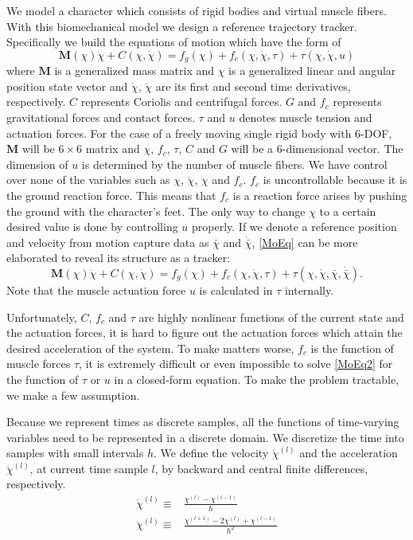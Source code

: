 \documentclass{acm_proc_article-sp}
\begin{document}
We model a character which consists of rigid bodies and virtual muscle fibers.
With this biomechanical model we design a reference trajectory tracker.
Specifically we build the equations of motion which have the
form of
\begin{equation}\label{MoEq}
\mathbf{M}(\chi)\ddot\chi + C(\chi,\dot\chi ) = f_g(\chi) + f_c(\chi, \dot\chi, \tau ) + \tau (\chi, \dot\chi, u)
\end{equation}
where $\mathbf{M}$ is a generalized mass matrix and $\chi$ is a generalized
linear and angular position
state vector and $\dot\chi$, $\ddot\chi$ are its first and second time derivatives,
respectively. $C$ represents Coriolis and centrifugal forces.
$G$ and $f_c$ represents gravitational forces and contact forces.
$\tau$ and $u$ denotes muscle tension and actuation forces.
For the case of a freely moving single
rigid body with 6-DOF, $\mathbf{M}$ will be $6\times 6$ matrix and $\chi$,
$f_c$, $\tau$, $C$ and $G$ will be a 6-dimensional vector. The dimension of $u$ is
determined by the number of muscle fibers. We have control
over none of the variables such as $\chi$, $\dot\chi$, $\ddot\chi$ and $f_c$.
$f_c$ is uncontrollable because it is the ground reaction force. This means that
$f_c$ is a reaction force arises by pushing the ground with the character's feet.
The only way to change $\chi$ to a certain desired value is done by controlling $u$
properly. If we denote a reference position and velocity from motion capture data
as $\bar\chi$ and $\dot{\bar\chi}$, \eqref{MoEq} can be more elaborated
to reveal its structure as a tracker:
\begin{equation}\label{MoEq2}
\mathbf{M}(\chi)\ddot\chi + C(\chi,\dot\chi ) = f_g(\chi) + f_c(\chi, \dot\chi, \tau ) + \tau (\chi, \dot\chi, \bar\chi, \dot{\bar\chi}).
\end{equation}
Note that the muscle actuation force $u$ is calculated in $\tau$ internally.

Unfortunately, $C$, $f_c$ and $\tau$ are highly nonlinear functions of the current state and the
actuation forces, it is hard to figure out the actuation forces which attain
the desired acceleration of the system. To make matters worse, $f_c$ is the function
of muscle forces $\tau$, it is extremely difficult or even impossible
to solve \eqref{MoEq2} for the function of $\tau$ or $u$ in a closed-form
equation.
To make the problem tractable, we make a few assumption.

Because we represent times as discrete samples, all the functions of
time-varying variables need to be represented in a discrete domain.
We discretize the time into samples with small intervals $h$. We define
the velocity $\dot\chi^{(l)}$ and the acceleration $\ddot\chi^{(l)}$, at current
time sample $l$, by backward and central finite differences, respectively.
\begin{align}
\dot\chi^{(l)}  \equiv {} & \frac{\chi^{(l)}-\chi^{(l-1)}}{h}\label{vel-dis}\\
\ddot\chi^{(l)} \equiv {} & \frac{\chi^{(l+1)}-2\chi^{(l)}+\chi^{(l-1)}}{h^2}\label{acc-dis}
\end{align}
\end{document}
